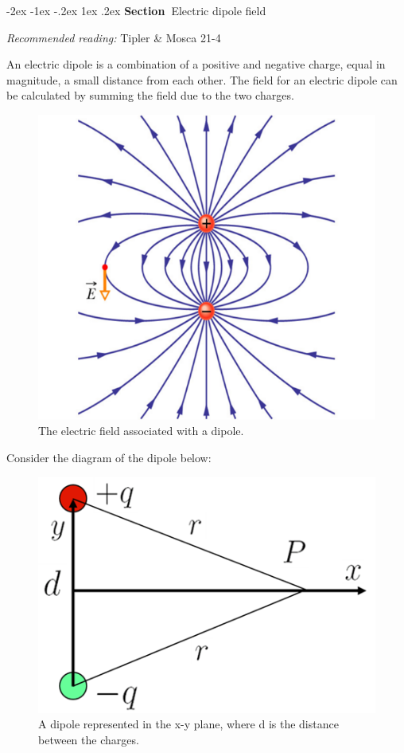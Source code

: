 \documentclass[
]{book}
\makeatletter
\renewcommand\section{%
\@startsection{section}{1}{\z@}%
              {-2ex \@plus -1ex \@minus -.2ex}%
              {1ex \@plus .2ex}%
              {\sffamily\bfseries\large\noindent Section~}}
\numberwithin{equation}{section}
\makeatother
\begin{document}
\hypertarget{electric-dipole-field}{%
\section{Electric dipole field}\label{electric-dipole-field}}

\emph{Recommended reading:} Tipler \& Mosca 21-4

An electric dipole is a combination of a positive and negative charge,
equal in magnitude, a small distance from each other. The field for an
electric dipole can be calculated by summing the field due to the two
charges.

\begin{figure}

{\centering \includegraphics[width=0.7\linewidth]{Figures/dipole_field} 

}

\caption{The electric field associated with a dipole.}\label{fig:dipoleField}
\end{figure}

Consider the diagram of the dipole below:

\begin{figure}

{\centering \includegraphics[width=0.7\linewidth]{Figures/dipole_diagram} 

}

\caption{A dipole represented in the x-y plane, where d is the distance between the charges.}\label{fig:dipoleDiagram}
\end{figure}
\end{document}
